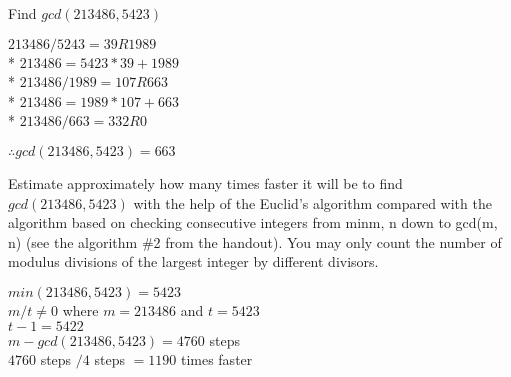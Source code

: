 \documentclass[12pt,largemargins]{homework}
\date{Septemeber 6, 2018}
\begin{document}
\maketitle
\normalsize

\question
  \begin{alphaparts}

  \item
    Find $gcd(213486, 5423)$

      $213486 / 5243 = 39 R 1989$ \\*
      $213486 = 5423 * 39 + 1989$ \\*
      $213486 / 1989 = 107 R 663$ \\*
      $213486 = 1989 * 107 + 663$ \\*
      $213486 / 663 = 332 R 0 $

    $\therefore gcd(213486,5423) = 663 $ 


  \item
    Estimate approximately how many times faster it will be to find
    $gcd(213486, 5423)$ with the help of the Euclid’s algorithm compared with the algorithm based on checking consecutive integers from min{m, n} down to gcd(m, n) (see the algorithm \#2 from the handout). You may only count the number of modulus divisions of the largest integer by different divisors.


      $min(213486,5423) = 5423$ \\
      $m/t \neq 0 $ where $m=213486$ and $ t=5423 $\\
      $t-1 = 5422 $ \\
      $m-gcd(213486, 5423) = 4760$ steps \\
      $4760$ steps $/4$ steps $=1190$ times faster 

\end{alphaparts}
\newpage
  \question
\end{document}
